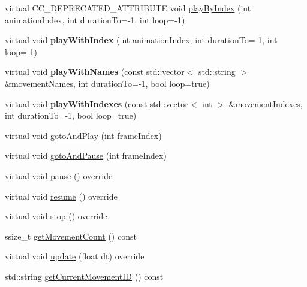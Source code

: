\begin{DoxyCompactItemize}
\item 
virtual C\+C\+\_\+\+D\+E\+P\+R\+E\+C\+A\+T\+E\+D\+\_\+\+A\+T\+T\+R\+I\+B\+U\+TE void \hyperlink{classcocostudio_1_1ArmatureAnimation_a31461695f1c48a33f49fb9d9fecedee5}{play\+By\+Index} (int animation\+Index, int duration\+To=-\/1, int loop=-\/1)
\item 
\mbox{\label{classcocostudio_1_1ArmatureAnimation_a615046dba2c0b7f5c5ff00d16f507bc1}} 
virtual void {\bfseries play\+With\+Index} (int animation\+Index, int duration\+To=-\/1, int loop=-\/1)
\item 
\mbox{\label{classcocostudio_1_1ArmatureAnimation_a724e85b46f68b8cba0364fd574d168f0}} 
virtual void {\bfseries play\+With\+Names} (const std\+::vector$<$ std\+::string $>$ \&movement\+Names, int duration\+To=-\/1, bool loop=true)
\item 
\mbox{\label{classcocostudio_1_1ArmatureAnimation_a66672a3fff1e396c907cc4920debb17c}} 
virtual void {\bfseries play\+With\+Indexes} (const std\+::vector$<$ int $>$ \&movement\+Indexes, int duration\+To=-\/1, bool loop=true)
\item 
virtual void \hyperlink{classcocostudio_1_1ArmatureAnimation_a377c9c33f633982c01c6c245b6eaa41e}{goto\+And\+Play} (int frame\+Index)
\item 
virtual void \hyperlink{classcocostudio_1_1ArmatureAnimation_a4d2f36f139143b58a1c25f26751d8318}{goto\+And\+Pause} (int frame\+Index)
\item 
virtual void \hyperlink{classcocostudio_1_1ArmatureAnimation_acbaf743cc3c24ef753a94c15a6783926}{pause} () override
\item 
virtual void \hyperlink{classcocostudio_1_1ArmatureAnimation_ae57f2ee86afc4029b18aff18fda7d96d}{resume} () override
\item 
virtual void \hyperlink{classcocostudio_1_1ArmatureAnimation_a4fed052a2b06d6ff7959d5e86c73044c}{stop} () override
\item 
ssize\+\_\+t \hyperlink{classcocostudio_1_1ArmatureAnimation_a1f32fed1a5f939a878df9f8355c412e3}{get\+Movement\+Count} () const
\item 
virtual void \hyperlink{classcocostudio_1_1ArmatureAnimation_aec1d25a2b9221801e29782b05eb44f42}{update} (float dt) override
\item 
std\+::string \hyperlink{classcocostudio_1_1ArmatureAnimation_a62ad0fdb64386138a022e4fca276f499}{get\+Current\+Movement\+ID} () const

\end{DoxyCompactItemize}
